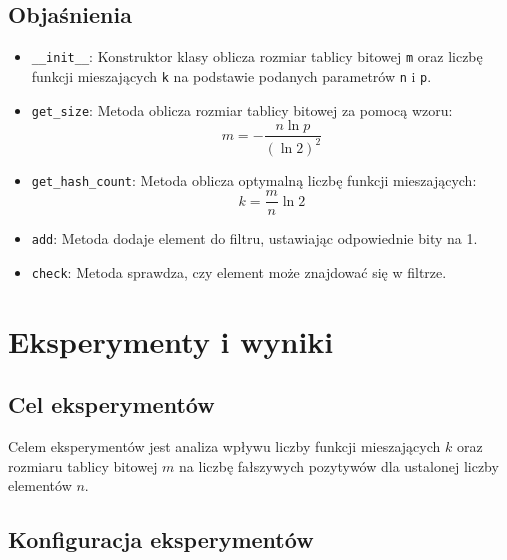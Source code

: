 \documentclass{article}
\begin{document}
\subsection{Objaśnienia}

\begin{itemize}
    \item \texttt{\_\_init\_\_}: Konstruktor klasy oblicza rozmiar tablicy bitowej \texttt{m} oraz liczbę funkcji mieszających \texttt{k} na podstawie podanych parametrów \texttt{n} i \texttt{p}.
    \item \texttt{get\_size}: Metoda oblicza rozmiar tablicy bitowej za pomocą wzoru:
    \begin{equation}
    m = -\frac{n \ln p}{(\ln 2)^2}
    \end{equation}
    \item \texttt{get\_hash\_count}: Metoda oblicza optymalną liczbę funkcji mieszających:
    \begin{equation}
    k = \frac{m}{n} \ln 2
    \end{equation}
    \item \texttt{add}: Metoda dodaje element do filtru, ustawiając odpowiednie bity na 1.
    \item \texttt{check}: Metoda sprawdza, czy element może znajdować się w filtrze.
\end{itemize}

\newpage

\section{Eksperymenty i wyniki}

\subsection{Cel eksperymentów}

Celem eksperymentów jest analiza wpływu liczby funkcji mieszających $k$ oraz rozmiaru tablicy bitowej $m$ na liczbę fałszywych pozytywów dla ustalonej liczby elementów $n$.

\subsection{Konfiguracja eksperymentów}
\end{document}
